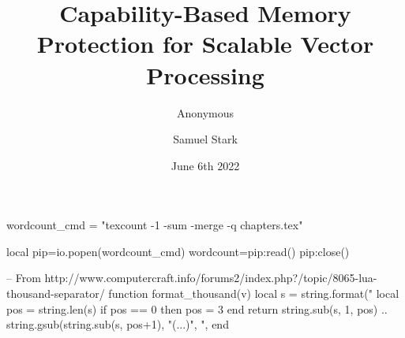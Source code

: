 
\title{Capability-Based Memory Protection for Scalable Vector Processing}

\ifdefined\turnipanon
\author{Anonymous}
\collegeshield{}
\else
\author{Samuel Stark}
\fi



\date{June 6th 2022}

\begin{luacode*}
wordcount_cmd = "texcount -1 -sum -merge -q chapters.tex"

local pip=io.popen(wordcount_cmd)
wordcount=pip:read()
pip:close()
    
-- From http://www.computercraft.info/forums2/index.php?/topic/8065-lua-thousand-separator/
function format_thousand(v)
    local s = string.format("%
    local pos = string.len(s) %
    if pos == 0 then pos = 3 end
    return string.sub(s, 1, pos)
    .. string.gsub(string.sub(s, pos+1), "(...)", ",%
end
\end{luacode*}
\newcommand{\wordcountdata}{
{
\setlength{\parindent}{0pt}
\setlength{\parskip}{\baselineskip}

Total Page Count:~\pageref*{LastPage}

Main chapters (excluding front-matter, references, appendix): \pagedifference{wc:start}{wc:end} (pp~\pageref{wc:start}-\pageref{wc:end})

Main chapters word count: \luadirect{tex.sprint(format_thousand(wordcount))} words

Word count methodology: \texttt{\luadirect{tex.sprint(wordcount_cmd)}}\\
This counts body text, heading text, caption text, and slightly over-counts references.
The anonymous version redacts some trivially identifying information, but uses the same word count as the de-anonymized version.
The appendices contain non-essential data that is summarized in the main text (e.g. full results, details on how to compile code), or re-statements of work done in the main text (e.g. a summary of all changes made to the CHERI-RISC-V spec).  
\todomark{Make sure the hypotheses are counted at least once, should the reproductions also be counted?}
}
}

